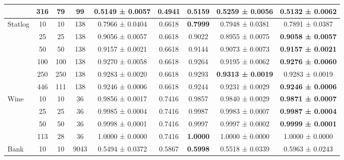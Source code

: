\begin{table}
{\begin{tabular}[H]{@{}lcccccccc@{}}
                              & 316   & 79   & 99   & 0.5149 ± 0.0057      & 0.4941               & 0.5159          & \textbf{0.5259 ± 0.0056} & 0.5132 ± 0.0062          \\
                              \midrule
\multirow{6}{*}{Statlog}      & 10    & 10   & 138  & 0.7966 ± 0.0404      & 0.6618               & \textbf{0.7999} & 0.7948 ± 0.0381          & 0.7891 ± 0.0387          \\
                              & 25    & 25   & 138  & 0.9056 ± 0.0057      & 0.6618               & 0.9022          & 0.8955 ± 0.0075          & \textbf{0.9058 ± 0.0057} \\
                              & 50    & 50   & 138  & 0.9157 ± 0.0021      & 0.6618               & 0.9144          & 0.9073 ± 0.0073          & \textbf{0.9157 ± 0.0021} \\
                              & 100   & 100  & 138  & 0.9270 ± 0.0058      & 0.6618               & 0.9264          & 0.9195 ± 0.0062          & \textbf{0.9276 ± 0.0060} \\
                              & 250   & 250  & 138  & 0.9283 ± 0.0020      & 0.6618               & 0.9293          & \textbf{0.9313 ± 0.0019} & 0.9283 ± 0.0019          \\
                              & 446   & 111  & 138  & 0.9246 ± 0.0006      & 0.6618               & 0.9244          & 0.9231 ± 0.0029          & \textbf{0.9246 ± 0.0006} \\
                              \midrule
\multirow{4}{*}{Wine}         & 10    & 10   & 36   & 0.9856 ± 0.0017      & 0.7416               & 0.9857          & 0.9840 ± 0.0029          & \textbf{0.9871 ± 0.0007} \\
                              & 25    & 25   & 36   & 0.9985 ± 0.0004      & 0.7416               & 0.9987          & 0.9983 ± 0.0007          & \textbf{0.9987 ± 0.0004} \\
                              & 50    & 50   & 36   & 0.9998 ± 0.0001      & 0.7416               & 0.9997          & 0.9997 ± 0.0002          & \textbf{0.9999 ± 0.0001} \\
                              & 113   & 28   & 36   & 1.0000 ± 0.0000      & 0.7416               & \textbf{1.0000} & 1.0000 ± 0.0000          & 1.0000 ± 0.0000          \\
                              \midrule
\multirow{7}{*}{Bank}         & 10    & 10   & 9043 & 0.5494 ± 0.0372      & 0.5867               & \textbf{0.5998} & 0.5518 ± 0.0339          & 0.5963 ± 0.0243          \\

\end{tabular}}
\end{table}
